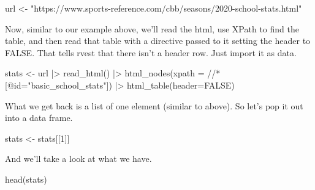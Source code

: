\documentclass[
  letterpaper,
  DIV=11,
  numbers=noendperiod]{scrreprt}
\newenvironment{Shaded}{\begin{snugshade}}{\end{snugshade}}
\newcommand{\AttributeTok}[1]{\textcolor[rgb]{0.40,0.45,0.13}{#1}}
\newcommand{\ConstantTok}[1]{\textcolor[rgb]{0.56,0.35,0.01}{#1}}
\newcommand{\DecValTok}[1]{\textcolor[rgb]{0.68,0.00,0.00}{#1}}
\newcommand{\FunctionTok}[1]{\textcolor[rgb]{0.28,0.35,0.67}{#1}}
\newcommand{\NormalTok}[1]{\textcolor[rgb]{0.00,0.23,0.31}{#1}}
\newcommand{\OtherTok}[1]{\textcolor[rgb]{0.00,0.23,0.31}{#1}}
\newcommand{\SpecialCharTok}[1]{\textcolor[rgb]{0.37,0.37,0.37}{#1}}
\newcommand{\StringTok}[1]{\textcolor[rgb]{0.13,0.47,0.30}{#1}}
\begin{document}
\begin{Shaded}
\begin{Highlighting}[]
\NormalTok{url }\OtherTok{\textless{}{-}} \StringTok{"https://www.sports{-}reference.com/cbb/seasons/2020{-}school{-}stats.html"}
\end{Highlighting}
\end{Shaded}

Now, similar to our example above, we'll read the html, use XPath to
find the table, and then read that table with a directive passed to it
setting the header to FALSE. That tells rvest that there isn't a header
row. Just import it as data.

\begin{Shaded}
\begin{Highlighting}[]
\NormalTok{stats }\OtherTok{\textless{}{-}}\NormalTok{ url }\SpecialCharTok{|\textgreater{}}
  \FunctionTok{read\_html}\NormalTok{() }\SpecialCharTok{|\textgreater{}}
  \FunctionTok{html\_nodes}\NormalTok{(}\AttributeTok{xpath =} \StringTok{\textquotesingle{}//*[@id="basic\_school\_stats"]\textquotesingle{}}\NormalTok{) }\SpecialCharTok{|\textgreater{}}
  \FunctionTok{html\_table}\NormalTok{(}\AttributeTok{header=}\ConstantTok{FALSE}\NormalTok{)}
\end{Highlighting}
\end{Shaded}

What we get back is a list of one element (similar to above). So let's
pop it out into a data frame.

\begin{Shaded}
\begin{Highlighting}[]
\NormalTok{stats }\OtherTok{\textless{}{-}}\NormalTok{ stats[[}\DecValTok{1}\NormalTok{]]}
\end{Highlighting}
\end{Shaded}

And we'll take a look at what we have.

\begin{Shaded}
\begin{Highlighting}[]
\FunctionTok{head}\NormalTok{(stats)}
\end{Highlighting}
\end{Shaded}
\end{document}
